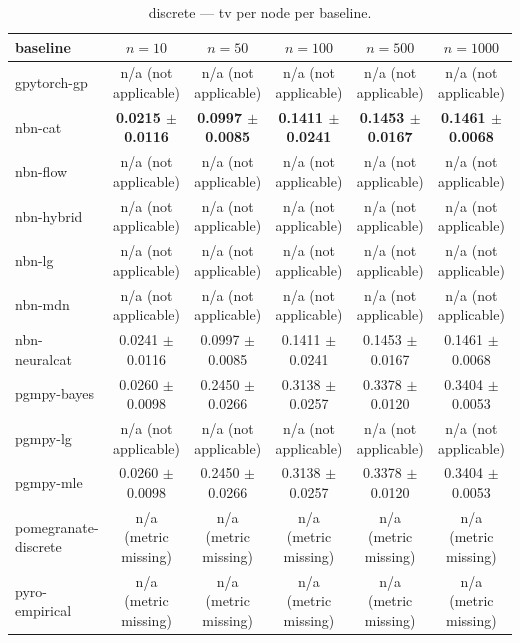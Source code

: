 \begin{table}[h]
\centering
\caption{discrete — tv per node per baseline.}
\label{tab:discrete_tv_per_node}
\begin{tabular}{lccccc}
\toprule
baseline & $n=10$ & $n=50$ & $n=100$ & $n=500$ & $n=1000$ \\
\midrule
gpytorch-gp & n/a (not applicable) & n/a (not applicable) & n/a (not applicable) & n/a (not applicable) & n/a (not applicable) \\
nbn-cat & \textbf{0.0215 $\pm$ 0.0116} & \textbf{0.0997 $\pm$ 0.0085} & \textbf{0.1411 $\pm$ 0.0241} & \textbf{0.1453 $\pm$ 0.0167} & \textbf{0.1461 $\pm$ 0.0068} \\
nbn-flow & n/a (not applicable) & n/a (not applicable) & n/a (not applicable) & n/a (not applicable) & n/a (not applicable) \\
nbn-hybrid & n/a (not applicable) & n/a (not applicable) & n/a (not applicable) & n/a (not applicable) & n/a (not applicable) \\
nbn-lg & n/a (not applicable) & n/a (not applicable) & n/a (not applicable) & n/a (not applicable) & n/a (not applicable) \\
nbn-mdn & n/a (not applicable) & n/a (not applicable) & n/a (not applicable) & n/a (not applicable) & n/a (not applicable) \\
nbn-neuralcat & 0.0241 $\pm$ 0.0116 & 0.0997 $\pm$ 0.0085 & 0.1411 $\pm$ 0.0241 & 0.1453 $\pm$ 0.0167 & 0.1461 $\pm$ 0.0068 \\
pgmpy-bayes & 0.0260 $\pm$ 0.0098 & 0.2450 $\pm$ 0.0266 & 0.3138 $\pm$ 0.0257 & 0.3378 $\pm$ 0.0120 & 0.3404 $\pm$ 0.0053 \\
pgmpy-lg & n/a (not applicable) & n/a (not applicable) & n/a (not applicable) & n/a (not applicable) & n/a (not applicable) \\
pgmpy-mle & 0.0260 $\pm$ 0.0098 & 0.2450 $\pm$ 0.0266 & 0.3138 $\pm$ 0.0257 & 0.3378 $\pm$ 0.0120 & 0.3404 $\pm$ 0.0053 \\
pomegranate-discrete & n/a (metric missing) & n/a (metric missing) & n/a (metric missing) & n/a (metric missing) & n/a (metric missing) \\
pyro-empirical & n/a (metric missing) & n/a (metric missing) & n/a (metric missing) & n/a (metric missing) & n/a (metric missing) \\
\bottomrule
\end{tabular}
\end{table}


